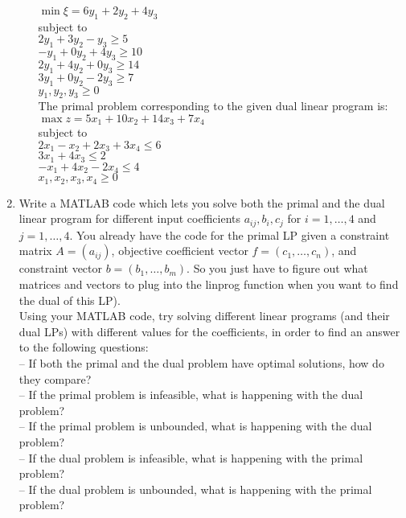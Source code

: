 \documentclass{article}
\begin{document}
\begin{enumerate}
\begin{enumerate}[a)]
$\min \xi = 6y_1 + 2y_2 + 4y_3$\\
subject to\\
$2y_1 + 3y_2 -y_3 \geq 5$ \\
$-y_1 + 0y_2 + 4y_3 \geq 10$ \\
$2y_1 + 4y_2 + 0y_3 \geq 14$ \\
$3y_1 +0y_2 -2y_3 \geq 7$ \\
$y_1, y_2, y_3 \geq 0$\\

The primal problem corresponding to the given dual linear program is: \\

$\max z = 5x_1 + 10x_2 + 14x_3 + 7x_4$\\
subject to\\
$2x_1 - x_2 + 2x_3 + 3x_4 \leq 6$ \\
$3x_1 + 4x_3  \leq 2$ \\
$-x_1 + 4x_2 -2x_4 \leq 4$ \\
$x_1, x_2, x_3, x_4 \geq 0$\\
\end{enumerate}

\newpage
\item

Write a MATLAB code which lets you solve both the primal and the dual linear
program for different input coefficients $a_{ij} , b_i, c_j$ for $i = 1,\dots ,4$ and $j = 1,\dots ,4$. You
already have the code for the primal LP given a constraint matrix $A = (a_{ij})$, objective coefficient vector $f = (c_1,\dots ,c_n)$, and constraint vector $b = (b_1,\dots ,b_m)$. So you just have to figure out what matrices and vectors to plug into the linprog function when you
want to find the dual of this LP). \\

Using your MATLAB code, try solving different linear programs (and their dual LPs)
with different values for the coefficients, in order to find an answer to the following
questions:\\

– If both the primal and the dual problem have optimal solutions, how do they
compare?\\
– If the primal problem is infeasible, what is happening with the dual problem?\\
– If the primal problem is unbounded, what is happening with the dual problem?\\
– If the dual problem is infeasible, what is happening with the primal problem?\\
– If the dual problem is unbounded, what is happening with the primal problem? \\


\end{enumerate}
\end{document}
